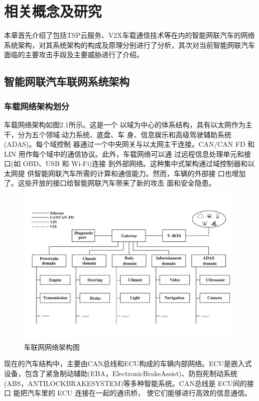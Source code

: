 \chapter{相关概念及研究}
\label{ch2}

本章首先介绍了包括TSP云服务、V2X车载通信技术等在内的智能网联汽车的网络系统架构，对其系统架构的构成及原理分别进行了分析，其次对当前智能网联汽车面临的主要攻击手段及主要威胁进行了介绍。

\section{智能网联汽车联网系统架构}

\subsection{车载网络架构划分}
车载网络架构如图2.1所示。这是一个
以域为中心的体系结构，具有以太网作为主干，分为五个领域:动力系统、底盘、车
身、信息娱乐和高级驾驶辅助系统(ADAS)。每个域控制
器通过一个中央网关与以太网主干连接。CAN/CAN FD 和
LIN 用作每个域中的通信协议。此外，车载网络可以通
过远程信息处理单元和接口(如 OBD、USB 和 Wi-Fi)连接
到外部网络。这种集中式架构通过域控制器和以太网提
供智能网联汽车所需的计算和通信能力。然而，车辆的外部接
口也增加了。这些开放的接口给智能网联汽车带来了新的攻击
面和安全隐患。
\begin{figure}
  \centering
  \includegraphics[scale=0.4]{resources/img/i1.jpg}
  \caption{车联网网络架构图}
\end{figure}
现在的汽车结构中，主要由CAN总线和ECU构成的车辆内部网络。ECU是嵌入式设备，包含了紧急制动辅助(EBA，ElectronicBrakeAssist)、防抱死制动系统(ABS，ANTILOCKBRAKESYSTEM)等多种智能系统。CAN总线是 ECU间的接口
能把汽车里的 ECU 连接在一起的通讯桥，
使它们能够进行高效的信息通信。

